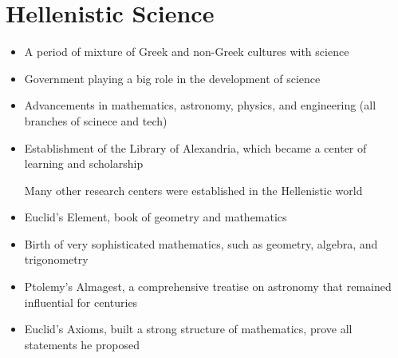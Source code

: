 \documentclass{article}
\begin{document}
\section*{Hellenistic Science}
\begin{itemize}
  \item A period of mixture of Greek and non-Greek cultures with science
  \item Government playing a big role in the development of science
  \item Advancements in mathematics, astronomy, physics, and engineering (all branches of scinece and tech)
  \item Establishment of the Library of Alexandria, which became a center of learning and scholarship

    Many other research centers were established in the Hellenistic world
  \item Euclid's Element, book of geometry and mathematics
  \item Birth of very sophisticated mathematics, such as geometry, algebra, and trigonometry
  \item Ptolemy's Almagest, a comprehensive treatise on astronomy that remained influential for centuries
  \item Euclid's Axioms, built a strong structure of mathematics,
    prove all statements he proposed
\end{itemize}
\end{document}
